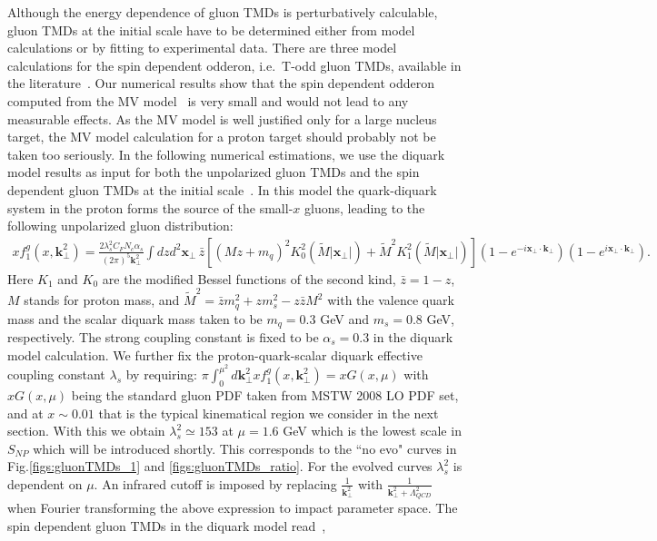 \documentclass[prd,aps,preprintnumbers,fleqn,showpacs,nofootinbib,superscriptaddress]{revtex4}
\newcommand{\sperp}{{\scriptscriptstyle \perp}}
\begin{document}
Although the energy dependence of 
  gluon TMDs is perturbatively calculable, gluon TMDs at the initial scale have to be determined either from model calculations or by fitting to experimental data.  
There are three model calculations for the spin dependent odderon, i.e.\ T-odd gluon TMDs, available in the literature~\cite{Zhou:2013gsa,Szymanowski:2016mbq,Dumitru:2021tqp}.  Our numerical results show that the spin dependent odderon computed from the MV model~\cite{Zhou:2013gsa} is very small and would not lead to any measurable effects.  As the MV model is well justified only for a large nucleus target, the MV model calculation for a proton target should probably not be taken too seriously.  In the following numerical estimations,  we use the diquark model results as input for both the unpolarized gluon TMDs and the spin dependent gluon TMDs at the initial scale~\cite{Szymanowski:2016mbq}.  In this model the quark-diquark system in the proton forms the source of the small-$x$ gluons, leading to the following unpolarized gluon distribution:
\begin{eqnarray}
\!\!\!\!\!\! xf_1^g(x,\bm{k}_\perp^2) =\frac{2 \lambda_s^2 C_F N_c \alpha_s }{(2\pi)^5 \bm{k}_\perp^2 } \!\! \int \! dz d^2\bm{x}_\sperp \,  \bar z \! \left[  \left( Mz+m_q \right)^2K_0^2(\tilde M |\bm{x}_\sperp|) +\tilde M^2 K_1^2(\tilde M |\bm{x}_\sperp|) \right ] (1\!-\!e^{-i\bm{x}_\sperp \cdot \bm{k}_\perp}) (1\! -\! e^{i\bm{x}_\sperp \cdot \bm{k}_\perp}).
\end{eqnarray}
Here $K_1$ and $K_0$ are the modified Bessel functions of the second kind, $\bar{z}=1-z$, $M$ stands for proton mass, and ${\tilde M}^2=\bar z m_q^2 +zm_s^2-z\bar z M^2$ with the valence quark mass and the scalar diquark mass  taken to be $m_q=0.3$ GeV and $m_s=0.8$ GeV, respectively. The strong coupling constant is fixed to be $\alpha_s=0.3$ in the diquark model calculation. We further  fix the proton-quark-scalar diquark effective coupling constant  $\lambda_s$ 
by requiring: $\pi \int_0^{\mu^2} d \bm{k}_\perp^2 x f_1^g(x, \bm{k}_\perp^2) = x G(x, \mu )$ with $x G(x, \mu )$ being the standard gluon PDF taken from MSTW 2008 LO PDF set, and at $x \sim 0.01$ that is the typical kinematical region we consider in the next section. With this we obtain $\lambda_s^2 \simeq 153$ at $\mu=1.6$ GeV which is the lowest scale in $S_{NP}$ which will be introduced  shortly. This corresponds to the ``no evo" curves in Fig.\ref{figs:gluonTMDs_1} and \ref{figs:gluonTMDs_ratio}. For the evolved curves $\lambda_s^2$ is dependent on $\mu$. An infrared cutoff is imposed by replacing $\frac{1}{\bm{k}_\perp^2}$ with  $\frac{1}{\bm{k}_\perp^2+\Lambda_{QCD}^2}$ when Fourier transforming the above expression to  impact parameter space.  The spin dependent gluon TMDs in the diquark model read~\cite{Szymanowski:2016mbq},
\end{document}
